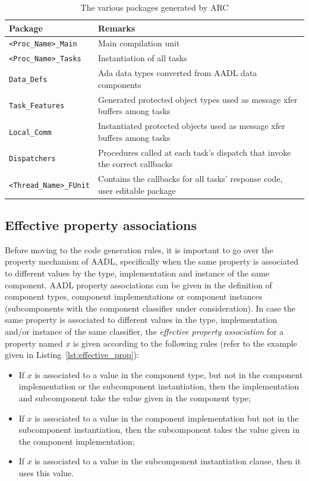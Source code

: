 \begin{table}
\begin{tabular}{|l|l|}
\hline
\textbf{Package} & \textbf{Remarks}\\
\hline
\texttt{<Proc\_Name>\_Main} & Main compilation unit\\
\texttt{<Proc\_Name>\_Tasks} & Instantiation of all tasks\\
\texttt{Data\_Defs} & Ada data types converted from AADL
data components\\
\texttt{Task\_Features} & Generated protected object
types used as message xfer buffers among tasks\\
\texttt{Local\_Comm} & Instantiated protected
objects used as message xfer buffers among tasks\\
\texttt{Dispatchers} & Procedures called at each
task's dispatch that invoke the correct callbacks\\
\texttt{<Thread\_Name>\_FUnit} & Contains the callbacks for all tasks'
response code, user editable package\\
\hline
\end{tabular}
\caption{The various packages generated by ARC}
\label{tab:packages}
\end{table}

\subsection{Effective property associations}
Before moving to the code generation rules, it is important to go over
the property mechanism of AADL, specifically when the same property is
associated to different values by the type, implementation and
instance of the same component. AADL property associations can be
given in the definition of component types, component implementations
or component instances (subcomponents with the component classifier
under consideration). In case the same property is associated to
different values in the type, implementation and/or instance of the
same classifier, the \emph{effective property association} for a
property named $x$ is given according to the following rules (refer to
the example given in Listing~\ref{lst:effective_prop}):

\begin{itemize}
\item{If $x$ is associated to a value in the component type, but not
  in the component implementation or the subcomponent instantiation,
  then the implementation and subcomponent take the value given in the
  component type;}
\item{If $x$ is associated to a value in the component implementation
  but not in the subcomponent instantiation, then the subcomponent
  takes the value given in the component implementation;}
\item{If $x$ is associated to a value in the subcomponent
  instantiation clause, then it uses this value.}
\end{itemize}

